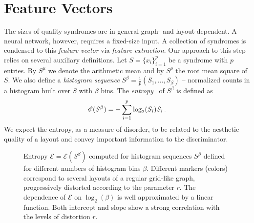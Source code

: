 
%

\section{Feature Vectors}
\label{sec:featex}

The sizes of quality syndromes are in general graph- and layout-dependent.  A neural network, however, requires a
fixed-size input.  A collection of syndromes is condensed to this \emph{feature vector} via \emph{feature extraction}.
Our approach to this step relies on several auxiliary definitions.  Let $S=\{x_i\}_{i=1}^p$ be a syndrome with $p$
entries.  By $S^\mu$ we denote the arithmetic mean and by $S^\rho$ the root mean square of $S$.  We also define a
\emph{histogram sequence} $S^\beta=\frac{1}{p}(S_1,\ldots,S_\beta)$ -- normalized counts in a histogram built over $S$
with $\beta$ bins.  The \emph{entropy}~\cite{Shannon1948} of $S^\beta$ is defined as
\begin{equation}
  \label{eqn:entropy}
  \Entropy(S^\beta) = -\sum_{i=1}^{p} \log_2(S_i) S_i
  \mathendpunct{.}
\end{equation}
We expect the entropy, as a measure of disorder, to be related to the aesthetic quality of a layout and convey important
information to the discriminator.

\begin{figure}[p]
  \begin{center}
  \end{center}
  \caption{%
    Entropy $\mathcal{E}=\mathcal{E}(S^\beta)$ computed for histogram sequences $S^\beta$ defined for different numbers
    of histogram bins $\beta$.  Different markers (colors) correspond to several layouts of a regular grid-like graph,
    progressively distorted according to the parameter $r$.
    The dependence of $\mathcal{E}$ on $\log_2(\beta)$ is well approximated by a linear function.  Both intercept and
    slope show a strong correlation with the levels of distortion $r$.
  }
  \label{fig:entropy-regression}
\end{figure}


